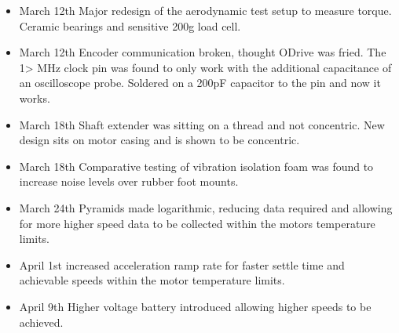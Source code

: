 \documentclass{article}
\begin{document}
\begin{itemize}
    \item March 12th Major redesign of the aerodynamic test setup to measure torque. Ceramic bearings and sensitive 200g load cell.
    \item March 12th Encoder communication broken, thought ODrive was fried. The 1> MHz clock pin was found to only work with the additional capacitance of an oscilloscope probe. Soldered on a 200pF capacitor to the pin and now it works.
    \item March 18th Shaft extender was sitting on a thread and not concentric. New design sits on motor casing and is shown to be concentric.
    \item March 18th Comparative testing of vibration isolation foam was found to increase noise levels over rubber foot mounts.
    \item March 24th Pyramids made logarithmic, reducing data required and allowing for more higher speed data to be collected within the motors temperature limits.
    \item April 1st increased acceleration ramp rate for faster settle time and achievable speeds within the motor temperature limits.
    \item April 9th Higher voltage battery introduced allowing higher speeds to be achieved.

\end{itemize}
\end{document}
